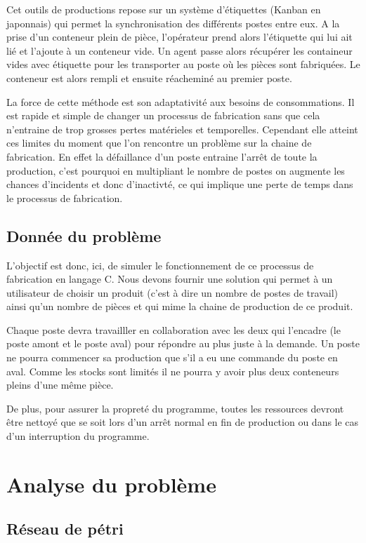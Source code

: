 \documentclass[11pt]{report}
\begin{document}
	Cet outils de productions repose sur un système d'étiquettes (Kanban en japonnais) qui permet la synchronisation des différents postes entre eux. A la prise d'un conteneur plein de pièce, l'opérateur prend alors l'étiquette qui lui ait lié et l'ajoute à un conteneur vide. Un agent passe alors récupérer les containeur vides avec étiquette pour les transporter au poste où les pièces sont fabriquées. Le conteneur est alors rempli et ensuite réacheminé au premier poste.
	
	La force de cette méthode est son adaptativité aux besoins de consommations. Il est rapide et simple de changer un processus de fabrication sans que cela n'entraine de trop grosses pertes matérieles et temporelles. Cependant elle atteint ces limites du moment que l'on rencontre un problème sur la chaine de fabrication. En effet la défaillance d'un poste entraine l'arrêt de toute la production, c'est pourquoi en multipliant le nombre de postes on augmente les chances d'incidents et donc d'inactivté, ce qui implique une perte de temps dans le processus de fabrication.
	
	\section{Donnée du problème}
	
	L'objectif est donc, ici, de simuler le fonctionnement de ce processus de fabrication en langage C. Nous devons fournir une solution qui permet à un utilisateur de choisir un produit (c'est à dire un nombre de postes de travail) ainsi qu'un nombre de pièces et qui mime la chaine de production de ce produit. 
	
	Chaque poste devra travailller en collaboration avec les deux qui l'encadre (le poste amont et le poste aval) pour répondre au plus juste à la demande. Un poste ne pourra commencer sa production que s'il a eu une commande du poste en aval. Comme les stocks sont limités il ne pourra y avoir plus deux conteneurs pleins d'une même pièce. 
	
	De plus, pour assurer la propreté du programme, toutes les ressources devront être nettoyé que se soit lors d'un arrêt normal en fin de production ou dans le cas d'un interruption du programme.
\chapter{Analyse du problème}
	
	\section{Réseau de pétri}
	
\end{document}
